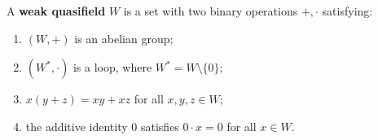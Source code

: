 A \textbf{weak quasifield} $W$ is a set with two binary operations $+, \cdot$ satisfying:
\begin{enumerate}
\item $(W, +)$ is an abelian group;
\item $(W^*, \cdot)$ is a loop, where $W^* = W \setminus \{0\}$;
\item $x(y+z) = xy+xz$ for all $x, y, z \in W$;
\item the additive identity $0$ satisfies $0 \cdot x = 0$ for all $x \in W$.
\end{enumerate}

